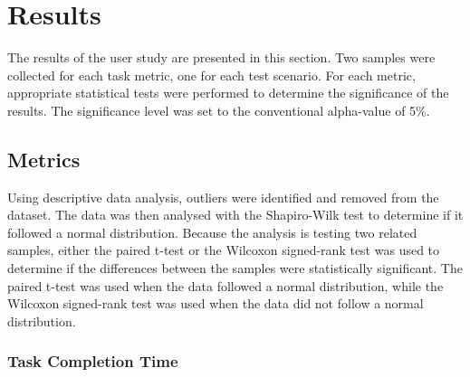 \section{Results}

    The results of the user study are presented in this section. Two samples were collected for each task metric, one for each test scenario. For each metric, appropriate statistical tests were performed to determine the significance of the results. The significance level was set to the conventional alpha-value of 5\%.


    \subsection{Metrics}

        
        Using descriptive data analysis, outliers were identified and removed from the dataset. The data was then analysed with the Shapiro-Wilk \cite{shapiroAnalysisVarianceTest1965} test to determine if it followed a normal distribution. Because the analysis is testing two related samples, either the paired t-test or the Wilcoxon signed-rank test \cite{wilcoxonIndividualComparisonsRanking1945} was used to determine if the differences between the samples were statistically significant. The paired t-test was used when the data followed a normal distribution, while the Wilcoxon signed-rank test was used when the data did not follow a normal distribution.

        \subsubsection{Task Completion Time}


